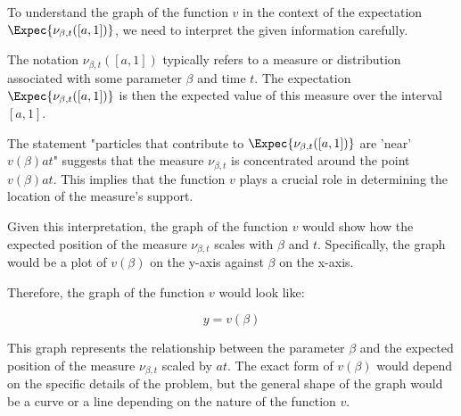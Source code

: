 To understand the graph of the function \( v \) in the context of the expectation \(\Expec{\nu_{\beta, t}([a, 1])}\), we need to interpret the given information carefully.

The notation \(\nu_{\beta, t}([a, 1])\) typically refers to a measure or distribution associated with some parameter \(\beta\) and time \(t\). The expectation \(\Expec{\nu_{\beta, t}([a, 1])}\) is then the expected value of this measure over the interval \([a, 1]\).

The statement "particles that contribute to \(\Expec{\nu_{\beta, t}([a, 1])}\) are 'near' \(v(\beta)at\)" suggests that the measure \(\nu_{\beta, t}\) is concentrated around the point \(v(\beta)at\). This implies that the function \(v\) plays a crucial role in determining the location of the measure's support.

Given this interpretation, the graph of the function \(v\) would show how the expected position of the measure \(\nu_{\beta, t}\) scales with \(\beta\) and \(t\). Specifically, the graph would be a plot of \(v(\beta)\) on the y-axis against \(\beta\) on the x-axis.

Therefore, the graph of the function \(v\) would look like:

\[
\boxed{y = v(\beta)}
\]

This graph represents the relationship between the parameter \(\beta\) and the expected position of the measure \(\nu_{\beta, t}\) scaled by \(at\). The exact form of \(v(\beta)\) would depend on the specific details of the problem, but the general shape of the graph would be a curve or a line depending on the nature of the function \(v\).